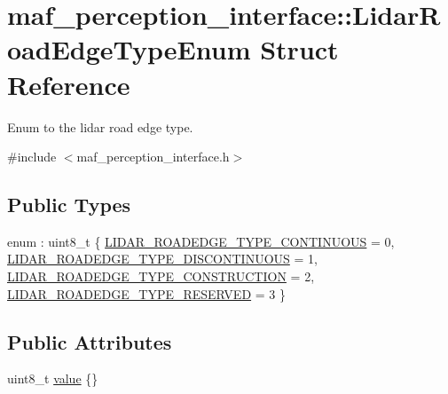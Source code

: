 \hypertarget{structmaf__perception__interface_1_1LidarRoadEdgeTypeEnum}{}\section{maf\+\_\+perception\+\_\+interface\+:\+:Lidar\+Road\+Edge\+Type\+Enum Struct Reference}
\label{structmaf__perception__interface_1_1LidarRoadEdgeTypeEnum}


Enum to the lidar road edge type.  




{\ttfamily \#include $<$maf\+\_\+perception\+\_\+interface.\+h$>$}

\subsection*{Public Types}
\begin{DoxyCompactItemize}
\item 
enum \+: uint8\+\_\+t \{ \hyperlink{structmaf__perception__interface_1_1LidarRoadEdgeTypeEnum_aefb7d94ea98d12492d4672cc39778deaa83d3dfcca87985e84abd649b39e85f9f}{L\+I\+D\+A\+R\+\_\+\+R\+O\+A\+D\+E\+D\+G\+E\+\_\+\+T\+Y\+P\+E\+\_\+\+C\+O\+N\+T\+I\+N\+U\+O\+US} = 0, 
\hyperlink{structmaf__perception__interface_1_1LidarRoadEdgeTypeEnum_aefb7d94ea98d12492d4672cc39778deaae29738a8b3bfc6098ac2f0e7afda4dd2}{L\+I\+D\+A\+R\+\_\+\+R\+O\+A\+D\+E\+D\+G\+E\+\_\+\+T\+Y\+P\+E\+\_\+\+D\+I\+S\+C\+O\+N\+T\+I\+N\+U\+O\+US} = 1, 
\hyperlink{structmaf__perception__interface_1_1LidarRoadEdgeTypeEnum_aefb7d94ea98d12492d4672cc39778deaa80ffebb032faac1c157c6a8c03256ebc}{L\+I\+D\+A\+R\+\_\+\+R\+O\+A\+D\+E\+D\+G\+E\+\_\+\+T\+Y\+P\+E\+\_\+\+C\+O\+N\+S\+T\+R\+U\+C\+T\+I\+ON} = 2, 
\hyperlink{structmaf__perception__interface_1_1LidarRoadEdgeTypeEnum_aefb7d94ea98d12492d4672cc39778deaa1eae6953d2268c8d1c7496e05dcaf393}{L\+I\+D\+A\+R\+\_\+\+R\+O\+A\+D\+E\+D\+G\+E\+\_\+\+T\+Y\+P\+E\+\_\+\+R\+E\+S\+E\+R\+V\+ED} = 3
 \}
\end{DoxyCompactItemize}
\subsection*{Public Attributes}
\begin{DoxyCompactItemize}
\item 
uint8\+\_\+t \hyperlink{structmaf__perception__interface_1_1LidarRoadEdgeTypeEnum_a9d73e32464095c64490cbe0aa97c5081}{value} \{\}
\end{DoxyCompactItemize}


